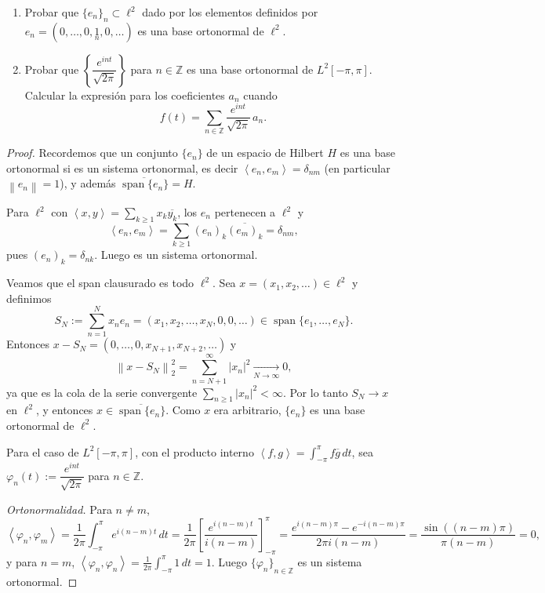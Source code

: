\documentclass{article}
\theoremstyle{definition}
\newcommand{\Z}{\mathbb{Z}}
\newcommand{\norm}[1]{\left\lVert #1 \right\rVert}       %
\newcommand{\cl}[1]{\overline{#1}}                       %
\newcommand{\ip}[2]{\left\langle #1, #2 \right\rangle}   %
\newenvironment{ejercicio}[1]{\begin{trivlist}
\item[\hskip \labelsep {\bfseries Ejercicio}\hskip \labelsep {\bfseries #1.}]}{\end{trivlist}}
\begin{document}
\vspace{0.5cm}

\begin{ejercicio}{3}
	\begin{enumerate}
		\item Probar que \( {\{e_n\}}_n \subset \ell^2 \) dado por los elementos definidos por \( e_n = (0, \dots, 0, \underset{n}{1}, 0, \dots) \) es una base ortonormal de \( \ell^2 \).
		\item Probar que \( \left \{ \dfrac{e^{int}}{\sqrt{2\pi}} \right \} \) para \( n \in \Z \) es una base ortonormal de \( L^2[-\pi, \pi] \). Calcular la expresión para los coeficientes \( a_n \) cuando
		      \[ f(t) = \sum_{n \in \Z} \frac{e^{int}}{\sqrt{2\pi}}\, a_n. \]
	\end{enumerate}
\end{ejercicio}
\begin{proof}
	Recordemos que un conjunto \( \{e_n\} \) de un espacio de Hilbert \( H \) es una base ortonormal si es un sistema ortonormal, es decir \( \ip{e_n}{e_m} = \delta_{nm} \) (en particular \( \norm{e_n} = 1 \)), y además \( \cl{\operatorname{span}\{e_n\}} = H \).

	Para \( \ell^2 \) con \( \ip{x}{y} = \sum_{k \ge 1} x_k \overline{y_k} \), los \( e_n \) pertenecen a \( \ell^2 \) y
	\[
		\ip{e_n}{e_m} = \sum_{k \ge 1} {(e_n)}_k \overline{{(e_m)}_k} = \delta_{nm},
	\]
	pues \( {(e_n)}_k = \delta_{nk} \). Luego es un sistema ortonormal.

	Veamos que el span clausurado es todo \( \ell^2 \). Sea \( x = (x_1, x_2, \ldots) \in \ell^2 \) y definimos
	\[
		S_N := \sum_{n=1}^{N} x_n e_n = (x_1, x_2, \ldots, x_N, 0, 0, \ldots) \in \operatorname{span}\{e_1, \dots, e_N\}.
	\]
	Entonces \( x - S_N = (0, \ldots, 0, x_{N+1}, x_{N+2}, \ldots) \) y
	\[
		\norm{x - S_N}_2^2 = \sum_{n=N+1}^{\infty} |x_n|^2 \xrightarrow[N \to \infty]{} 0,
	\]
	ya que es la cola de la serie convergente \( \sum_{n \ge 1} |x_n|^2 < \infty \). Por lo tanto \( S_N \to x \) en \( \ell^2 \), y entonces \( x \in \cl{\operatorname{span}\{e_n\}} \). Como \( x \) era arbitrario, \( \{e_n\} \) es una base ortonormal de \( \ell^2 \).

	Para el caso de \( L^2[-\pi, \pi] \), con el producto interno \( \ip{f}{g} = \int_{-\pi}^{\pi} f \overline{g} \, dt \), sea \( \varphi_n(t) := \dfrac{e^{int}}{\sqrt{2\pi}} \) para \( n \in \Z \).

	\emph{Ortonormalidad.} Para \( n \neq m \),
	\[
		\ip{\varphi_n}{\varphi_m} = \frac{1}{2\pi} \int_{-\pi}^{\pi} e^{i(n-m)t} \, dt = \frac{1}{2\pi} {\left[ \frac{e^{i(n-m)t}}{i(n-m)} \right]}_{-\pi}^{\pi} = \frac{e^{i(n-m)\pi} - e^{-i(n-m)\pi}}{2\pi i (n-m)} = \frac{\sin\left((n-m)\pi\right)}{\pi (n-m)} = 0,
	\]
	y para \( n = m \), \( \ip{\varphi_n}{\varphi_n} = \frac{1}{2\pi} \int_{-\pi}^{\pi} 1 \, dt = 1 \). Luego \( {\{\varphi_n \}}_{n \in \Z} \) es un sistema ortonormal.


\end{proof}
\end{document}
